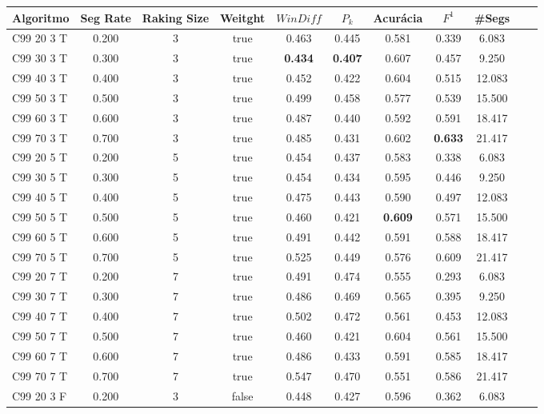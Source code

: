 \documentclass{article}
\begin{document}
\begin{longtable}[c]{|l|c|c|c|c|c|c|c|c|c|c|} 
\hline 
Algoritmo & Seg Rate & Raking Size & Weitght & $WinDiff$ & $P_k$ & Acurácia & $F^1$ & \#Segs\\ \hline 
C99 20  3 T & 0.200 & 3 & true & 0.463 & 0.445 & 0.581 & 0.339 & 6.083  \\ \hline 
 C99 30  3 T & 0.300 & 3 & true & \cellcolor{gray!20} \textbf{0.434} & \cellcolor{gray!20} \textbf{0.407} & 0.607 & 0.457 & 9.250  \\ \hline 
 C99 40  3 T & 0.400 & 3 & true & 0.452 & 0.422 & 0.604 & 0.515 & 12.083  \\ \hline 
 C99 50  3 T & 0.500 & 3 & true & 0.499 & 0.458 & 0.577 & 0.539 & 15.500  \\ \hline 
 C99 60  3 T & 0.600 & 3 & true & 0.487 & 0.440 & 0.592 & 0.591 & 18.417  \\ \hline 
 C99 70  3 T & 0.700 & 3 & true & 0.485 & 0.431 & 0.602 & \cellcolor{gray!20} \textbf{0.633} & 21.417  \\ \hline 
 C99 20  5 T & 0.200 & 5 & true & 0.454 & 0.437 & 0.583 & 0.338 & 6.083  \\ \hline 
 C99 30  5 T & 0.300 & 5 & true & 0.454 & 0.434 & 0.595 & 0.446 & 9.250  \\ \hline 
 C99 40  5 T & 0.400 & 5 & true & 0.475 & 0.443 & 0.590 & 0.497 & 12.083  \\ \hline 
 C99 50  5 T & 0.500 & 5 & true & 0.460 & 0.421 & \cellcolor{gray!20} \textbf{0.609} & 0.571 & 15.500  \\ \hline 
 C99 60  5 T & 0.600 & 5 & true & 0.491 & 0.442 & 0.591 & 0.588 & 18.417  \\ \hline 
 C99 70  5 T & 0.700 & 5 & true & 0.525 & 0.449 & 0.576 & 0.609 & 21.417  \\ \hline 
 C99 20  7 T & 0.200 & 7 & true & 0.491 & 0.474 & 0.555 & 0.293 & 6.083  \\ \hline 
 C99 30  7 T & 0.300 & 7 & true & 0.486 & 0.469 & 0.565 & 0.395 & 9.250  \\ \hline 
 C99 40  7 T & 0.400 & 7 & true & 0.502 & 0.472 & 0.561 & 0.453 & 12.083  \\ \hline 
 C99 50  7 T & 0.500 & 7 & true & 0.460 & 0.421 & 0.604 & 0.561 & 15.500  \\ \hline 
 C99 60  7 T & 0.600 & 7 & true & 0.486 & 0.433 & 0.591 & 0.585 & 18.417  \\ \hline 
 C99 70  7 T & 0.700 & 7 & true & 0.547 & 0.470 & 0.551 & 0.586 & 21.417  \\ \hline 
 C99 20  3 F & 0.200 & 3 & false & 0.448 & 0.427 & 0.596 & 0.362 & 6.083  \\ \hline 

\end{longtable}
\end{document}
